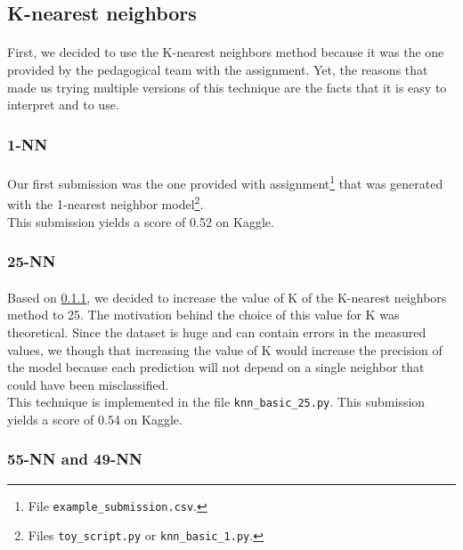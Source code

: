 \documentclass[a4paper, 11pt, oneside]{article}
\begin{document}
\subsection{K-nearest neighbors}
\paragraph{}First, we decided to use the K-nearest neighbors method because it was the one provided by the pedagogical team with the assignment. Yet, the reasons that made us trying multiple versions of this technique are the facts that it is easy to interpret and to use.

\subsubsection{1-NN} \label{1NN}
\paragraph{}Our first submission was the one provided with assignment\footnote{File \texttt{example\_submission.csv}.} that was generated with the 1-nearest neighbor model\footnote{Files \texttt{toy\_script.py} or \texttt{knn\_basic\_1.py}.}.\\
This submission yields a score of 0.52 on Kaggle.

\subsubsection{25-NN}
\paragraph{}Based on \ref{1NN}, we decided to increase the value of K of the K-nearest neighbors method to 25. The motivation behind the choice of this value for K was theoretical. Since the dataset is huge and can contain errors in the measured values, we though that increasing the value of K would increase the precision of the model because each prediction will not depend on a single neighbor that could have been misclassified.\\
This technique is implemented in the file \texttt{knn\_basic\_25.py}. This submission yields a score of 0.54 on Kaggle.

\subsubsection{55-NN and 49-NN}
\end{document}
